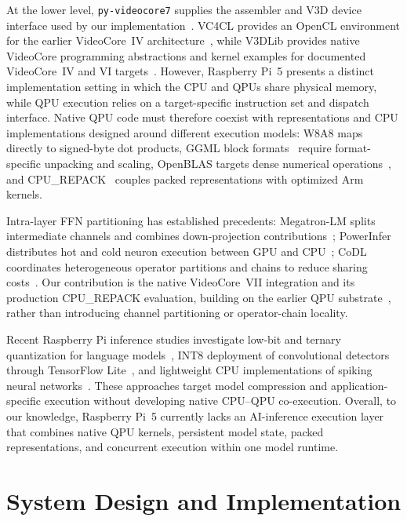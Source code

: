 \documentclass[sigplan,screen,review]{acmart}
\begin{document}
At the lower level, \texttt{py-videocore7} supplies the assembler and V3D device interface used by our implementation~\cite{pyvideocore7}. VC4CL provides an OpenCL environment for the earlier VideoCore~IV architecture~\cite{vc4cl}, while V3DLib provides native VideoCore programming abstractions and kernel examples for documented VideoCore~IV and VI targets~\cite{v3dlib}. However, Raspberry Pi~5 presents a distinct implementation setting in which the CPU and QPUs share physical memory, while QPU execution relies on a target-specific instruction set and dispatch interface. Native QPU code must therefore coexist with representations and CPU implementations designed around different execution models: W8A8 maps directly to signed-byte dot products, GGML block formats~\cite{llamacpp} require format-specific unpacking and scaling, OpenBLAS targets dense numerical operations~\cite{openblas}, and CPU\_REPACK~\cite{llamacpp} couples packed representations with optimized Arm kernels.

Intra-layer FFN partitioning has established precedents: Megatron-LM splits intermediate channels and combines down-projection contributions~\cite{shoeybi2019megatron}; PowerInfer distributes hot and cold neuron execution between GPU and CPU~\cite{song2024powerinfer}; CoDL coordinates heterogeneous operator partitions and chains to reduce sharing costs~\cite{jia2022codl}. Our contribution is the native VideoCore~VII integration and its production CPU\_REPACK evaluation, building on the earlier QPU substrate~\cite{hadjiyianni2026qpu}, rather than introducing channel partitioning or operator-chain locality.

Recent Raspberry Pi inference studies investigate low-bit and ternary quantization for language models~\cite{llmpi}, INT8 deployment of convolutional detectors through TensorFlow Lite~\cite{boddu2025quantizedyolo}, and lightweight CPU implementations of spiking neural networks~\cite{derzhavin2025spiffy}. These approaches target model compression and application-specific execution without developing native CPU--QPU co-execution. Overall, to our knowledge, Raspberry Pi~5 currently lacks an AI-inference execution layer that combines native QPU kernels, persistent model state, packed representations, and concurrent execution within one model runtime.


\section{System Design and Implementation}
\end{document}
